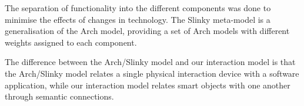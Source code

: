The separation of functionality into the different components was done to minimise the effects of changes in technology. The Slinky meta-model is a generalisation of the Arch model, providing a set of Arch models with different weights assigned to each component.

The difference between the Arch/Slinky model and our interaction model is that the  Arch/Slinky model relates a single physical interaction device with a software application, while our interaction model relates smart objects with one another through semantic connections.
% 
% 
% 
% 	
% 
